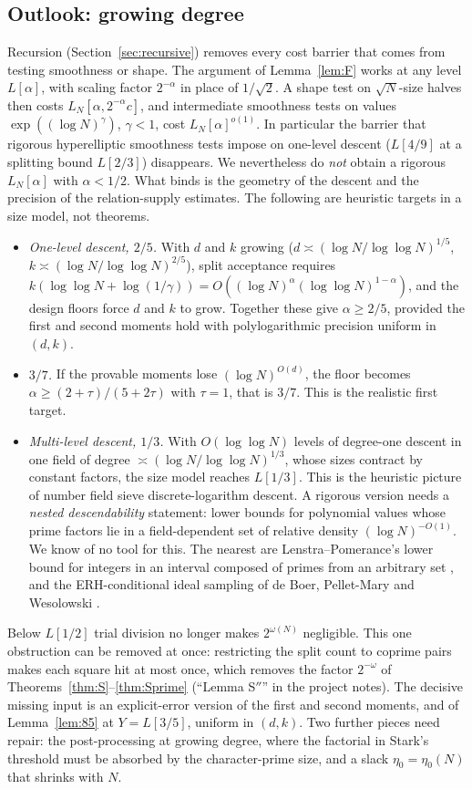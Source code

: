 \documentclass[11pt]{amsart}
\theoremstyle{definition}
\begin{document}
\subsection{Outlook: growing degree}
Recursion (Section~\ref{sec:recursive}) removes every cost barrier that comes from testing smoothness or shape. The argument of
Lemma~\ref{lem:F} works at any level $L[\alpha]$, with scaling factor $2^{-\alpha}$ in place of $1/\sqrt2$. A shape test on $\sqrt N$-size halves then costs
$L_N[\alpha,2^{-\alpha}c]$, and intermediate smoothness tests on values $\exp((\log N)^\gamma)$, $\gamma<1$, cost $L_N[\alpha]^{o(1)}$. In particular the barrier
that rigorous hyperelliptic smoothness tests impose on one-level descent ($L[4/9]$ at a splitting bound $L[2/3]$) disappears. We
nevertheless do \emph{not} obtain a rigorous $L_N[\alpha]$ with $\alpha<1/2$. What binds is the geometry of the descent and the precision of the
relation-supply estimates. The following are heuristic targets in a size model, not theorems.
\begin{itemize}
\item \emph{One-level descent, $2/5$.} With $d$ and $k$ growing ($d\asymp(\log N/\log\log N)^{1/5}$, $k\asymp(\log N/\log\log N)^{2/5}$), split acceptance requires
  $k(\log\log N+\log(1/\gamma))=O((\log N)^\alpha(\log\log N)^{1-\alpha})$, and the design floors force $d$ and $k$ to grow. Together these give $\alpha\ge2/5$,
  provided the first and second moments hold with polylogarithmic precision uniform in $(d,k)$.
\item \emph{$3/7$.} If the provable moments lose $(\log N)^{O(d)}$, the floor becomes $\alpha\ge(2+\tau)/(5+2\tau)$ with $\tau=1$, that is $3/7$.
  This is the realistic first target.
\item \emph{Multi-level descent, $1/3$.} With $O(\log\log N)$ levels of degree-one descent in one field of degree $\asymp(\log N/\log\log N)^{1/3}$, whose sizes
  contract by constant factors, the size model reaches $L[1/3]$. This is the heuristic picture of number field sieve discrete-logarithm descent. A
  rigorous version needs a \emph{nested descendability} statement: lower bounds for polynomial values whose prime factors lie in a
  field-dependent set of relative density $(\log N)^{-O(1)}$. We know of no tool for this. The nearest are Lenstra--Pomerance's lower bound for
  integers in an interval composed of primes from an arbitrary set \cite[Thm.~6.1]{lp1992}, and the ERH-conditional ideal sampling of de
  Boer, Pellet-Mary and Wesolowski \cite{dbpw2025}.
\end{itemize}
Below $L[1/2]$ trial division no longer makes $2^{\omega(N)}$ negligible. This one obstruction can be removed at once: restricting the split
count to coprime pairs makes each square hit at most once, which removes the factor $2^{-\omega}$ of Theorems~\ref{thm:S}--\ref{thm:Sprime}
(``Lemma S$''$'' in the project notes). The decisive missing input is an explicit-error version of the first and second moments, and of
Lemma~\ref{lem:85} at $Y=L[3/5]$, uniform in $(d,k)$. Two further pieces need repair: the post-processing at growing degree, where the
factorial in Stark's threshold must be absorbed by the character-prime size, and a slack $\eta_0=\eta_0(N)$ that shrinks with $N$.
\end{document}
